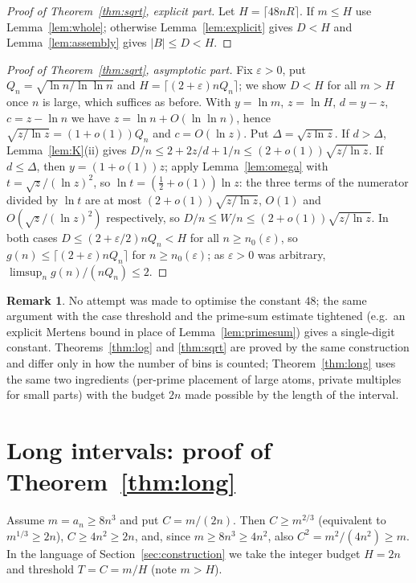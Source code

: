 \documentclass[11pt]{article}
\theoremstyle{definition}
\newtheorem{remark}[theorem]{Remark}
\begin{document}
\begin{proof}[Proof of Theorem~\ref{thm:sqrt}, explicit part]
Let $H=\lceil 48nR\rceil$. If $m\le H$ use Lemma~\ref{lem:whole}; otherwise Lemma~\ref{lem:explicit} gives
$D<H$ and Lemma~\ref{lem:assembly} gives $|B|\le D<H$.
\end{proof}

\begin{proof}[Proof of Theorem~\ref{thm:sqrt}, asymptotic part]
Fix $\varepsilon>0$, put $Q_n=\sqrt{\ln n/\ln\ln n}$ and $H=\lceil(2+\varepsilon)nQ_n\rceil$; we show $D<H$
for all $m>H$ once $n$ is large, which suffices as before. With $y=\ln m$, $z=\ln H$, $d=y-z$, $c=z-\ln n$ we
have $z=\ln n+O(\ln\ln n)$, hence $\sqrt{z/\ln z}=(1+o(1))Q_n$ and $c=O(\ln z)$. Put $\Delta=\sqrt{z\ln z}$.
If $d>\Delta$, Lemma~\ref{lem:K}(ii) gives $D/n\le 2+2z/d+1/n\le(2+o(1))\sqrt{z/\ln z}$. If $d\le\Delta$, then
$y=(1+o(1))z$; apply Lemma~\ref{lem:omega} with $t=\sqrt z/(\ln z)^2$, so $\ln t=(\tfrac12+o(1))\ln z$:
the three terms of the numerator divided by $\ln t$ are at most $(2+o(1))\sqrt{z/\ln z}$, $O(1)$ and
$O(\sqrt z/(\ln z)^2)$ respectively, so $D/n\le W/n\le(2+o(1))\sqrt{z/\ln z}$. In both cases
$D\le(2+\varepsilon/2)nQ_n<H$ for all $n\ge n_0(\varepsilon)$, so $g(n)\le\lceil(2+\varepsilon)nQ_n\rceil$ for
$n\ge n_0(\varepsilon)$; as $\varepsilon>0$ was arbitrary, $\limsup_n g(n)/(nQ_n)\le 2$.
\end{proof}

\begin{remark}
No attempt was made to optimise the constant $48$; the same argument with the case threshold and the
prime-sum estimate tightened (e.g.\ an explicit Mertens bound in place of Lemma~\ref{lem:primesum}) gives
a single-digit constant. Theorems~\ref{thm:log} and \ref{thm:sqrt} are proved by the same construction and
differ only in how the number of bins is counted; Theorem~\ref{thm:long} uses the same two ingredients
(per-prime placement of large atoms, private multiples for small parts) with the budget $2n$ made possible by
the length of the interval.
\end{remark}

\section{Long intervals: proof of Theorem~\ref{thm:long}}\label{sec:long}

Assume $m=a_n\ge 8n^3$ and put $C=m/(2n)$. Then $C\ge m^{2/3}$ (equivalent to $m^{1/3}\ge 2n$),
$C\ge 4n^2\ge 2n$, and, since $m\ge 8n^3\ge 4n^2$, also $C^2=m^2/(4n^2)\ge m$. In the language of
Section~\ref{sec:construction} we take the integer budget $H=2n$ and threshold $T=C=m/H$ (note $m>H$).
\end{document}
